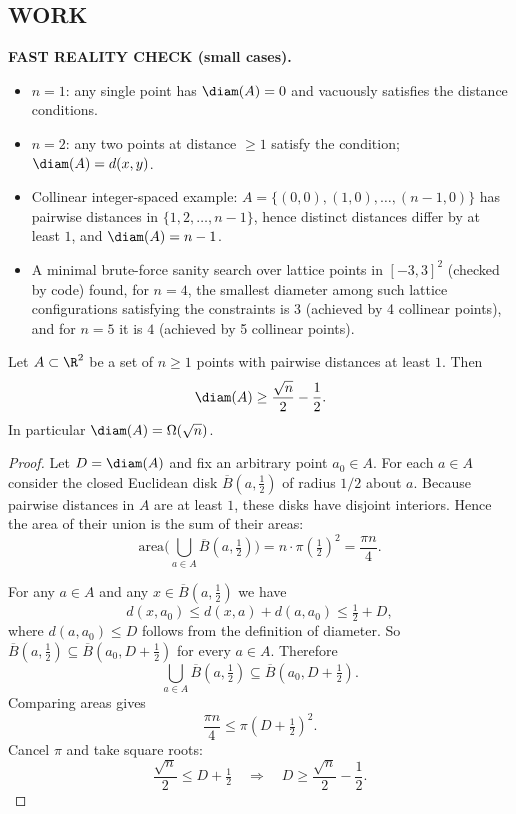 \subsection*{WORK}
\noindent\textbf{FAST REALITY CHECK (small cases).}
\begin{itemize}[leftmargin=2em]
\item $n=1$: any single point has $\diam(A)=0$ and vacuously satisfies the distance conditions.
\item $n=2$: any two points at distance $\ge 1$ satisfy the condition; $\diam(A)=d(x,y)$.
\item Collinear integer-spaced example: $A=\{(0,0),(1,0),\dots,(n-1,0)\}$ has pairwise distances in $\{1,2,\dots,n-1\}$, hence distinct distances differ by at least $1$, and $\diam(A)=n-1$.
\item A minimal brute-force sanity search over lattice points in $[-3,3]^2$ (checked by code) found, for $n=4$, the smallest diameter among such lattice configurations satisfying the constraints is $3$ (achieved by 4 collinear points), and for $n=5$ it is $4$ (achieved by 5 collinear points).
\end{itemize}

\begin{lemma}
Let $A\subset\R^2$ be a set of $n\ge 1$ points with pairwise distances at least $1$. Then
\[\diam(A)\ge \frac{\sqrt{n}}{2}-\frac12.\]
In particular $\diam(A)=\Omega(\sqrt{n})$.
\end{lemma}

\begin{proof}
Let $D=\diam(A)$ and fix an arbitrary point $a_0\in A$.
For each $a\in A$ consider the closed Euclidean disk $\overline{B}(a,\tfrac12)$ of radius $1/2$ about $a$.
Because pairwise distances in $A$ are at least $1$, these disks have disjoint interiors.
Hence the area of their union is the sum of their areas:
\[\text{area}\Big(\bigcup_{a\in A}\overline{B}(a,\tfrac12)\Big)= n\cdot \pi\left(\tfrac12\right)^2 = \frac{\pi n}{4}.\]

For any $a\in A$ and any $x\in \overline{B}(a,\tfrac12)$ we have
\[d(x,a_0)\le d(x,a)+d(a,a_0)\le \tfrac12 + D,\]
where $d(a,a_0)\le D$ follows from the definition of diameter.
So $\overline{B}(a,\tfrac12)\subseteq \overline{B}(a_0,D+\tfrac12)$ for every $a\in A$.
Therefore
\[\bigcup_{a\in A}\overline{B}(a,\tfrac12)\subseteq \overline{B}(a_0,D+\tfrac12).\]
Comparing areas gives
\[\frac{\pi n}{4}\le \pi\left(D+\tfrac12\right)^2.\]
Cancel $\pi$ and take square roots:
\[\frac{\sqrt{n}}{2}\le D+\tfrac12\quad\Rightarrow\quad D\ge \frac{\sqrt{n}}{2}-\frac12.\]
\end{proof}

